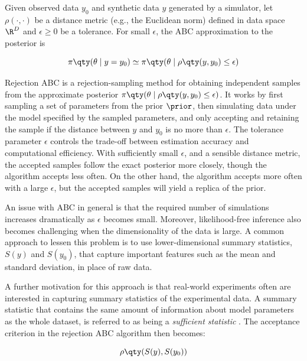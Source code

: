 Given observed data $y_0$ and synthetic data $y$ generated by a simulator, let $\rho (\cdot, \cdot)$ be a distance metric (e.g., the Euclidean norm) defined in data space $\R^D$ and $\epsilon \geq 0$ be a tolerance. For small $\epsilon$, the ABC approximation to the posterior is 

\begin{equation}
    \pi \qty(\theta \mid y=y_0) \simeq \pi \qty(\theta \mid \rho \qty(y, y_0) \leq \epsilon)
\end{equation}


Rejection ABC is a rejection-sampling method for obtaining independent samples from the approximate posterior $ \pi \qty(\theta \mid \rho \qty(y, y_0) \leq \epsilon)$. It works by first sampling a set of parameters from the prior $\prior$, then simulating data under the model specified by the sampled parameters, and only accepting and retaining the sample if the distance between $y$ and $y_0$ is no more than $\epsilon$. The tolerance parameter $\epsilon$ controls the trade-off between estimation accuracy and computational efficiency. With sufficiently small $\epsilon$, and a sensible distance metric, the accepted samples follow the exact posterior more closely, though the algorithm accepts less often. On the other hand, the algorithm accepts more often with a large $\epsilon$, but the accepted samples will yield a replica of the prior.

An issue with ABC in general is that the required number of simulations increases dramatically as $\epsilon$ becomes small. Moreover, likelihood-free inference also becomes challenging when the dimensionality of the data is large. A common approach to lessen this problem is to use lower-dimensional summary statistics, $S(y)$ and $S(y_0)$, that capture important features such as the mean and standard deviation, in place of raw data. %

A further motivation for this approach is that real-world experiments often are interested in capturing summary statistics of the experimental data. A summary statistic that contains the same amount of information about model parameters as the whole dataset, is referred to as being a \textit{sufficient statistic} \cite{ABCprimer}. The acceptance criterion in the rejection ABC algorithm then becomes:

\begin{equation}
    \rho \qty(S(y), S(y_0))
\end{equation}

